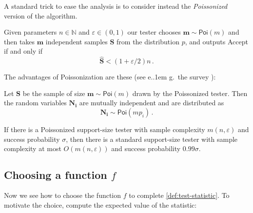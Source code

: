 \documentclass{theoretics}
\newcommand*\eg{e.\kern.1em g.\ }
\newcommand{\bN}{\ensuremath{\mathbb{N}}}
\newcommand{\Poi}{\mathsf{Poi}}
\newcommand{\successprob}{\sigma}
\renewcommand{\epsilon}{\varepsilon}
\begin{document}
A standard trick to ease the analysis is to consider instead the \emph{Poissonized} version of the
algorithm.
\begin{definition}
\label{def:poisson-tester}
Given parameters $n \in \bN$ and $\epsilon \in (0,1)$ our tester chooses $\bm{m} \sim \Poi(m)$ and
then takes $\bm{m}$ independent samples $\bm{S}$ from the distribution $p$, and outputs
\textsf{Accept} if and only if
\[
  \bm{\widehat S} < (1 + \epsilon/2) n \,.
\]
\end{definition}

The advantages of Poissonization are these (see \eg the survey \cite{Can20}):

\begin{fact}
\label{fact:poisson}
Let $\bm S$ be the sample of size $\bm m \sim \Poi(m)$ drawn by the Poissonized tester.
Then the random variables $\bm{N_i}$ are mutually independent and are distributed as
\[
  \bm{N_i} \sim \Poi(m p_i) \,.
\]
\end{fact}

\begin{fact}
\label{fact:poissonization}
If there is a Poissonized support-size tester with sample complexity $m(n,\epsilon)$ and success
probability $\successprob$, then there is a standard support-size tester with sample complexity at
most $O(m(n,\epsilon))$ and success probability $0.99 \successprob$.
\end{fact}



\subsection{Choosing a function \texorpdfstring{$f$}{f}}
\label{section:choosing_f}

Now we see how to choose the function $f$ to complete \cref{def:test-statistic}. To motivate the
choice, compute the expected value of the statistic:
\end{document}
